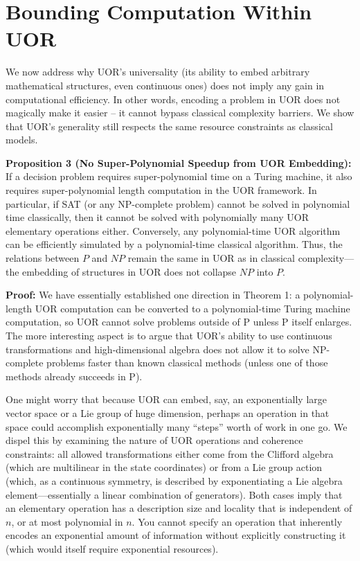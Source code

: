 \documentclass{article}
\begin{document}
\section{Bounding Computation Within UOR}

We now address why UOR’s universality (its ability to embed arbitrary mathematical structures, even continuous ones) does not imply any gain in computational efficiency. In other words, encoding a problem in UOR does not magically make it easier – it cannot bypass classical complexity barriers. We show that UOR’s generality still respects the same resource constraints as classical models.

\medskip
\textbf{Proposition 3 (No Super-Polynomial Speedup from UOR Embedding):} If a decision problem requires super-polynomial time on a Turing machine, it also requires super-polynomial length computation in the UOR framework. In particular, if SAT (or any NP-complete problem) cannot be solved in polynomial time classically, then it cannot be solved with polynomially many UOR elementary operations either. Conversely, any polynomial-time UOR algorithm can be efficiently simulated by a polynomial-time classical algorithm. Thus, the relations between $P$ and $NP$ remain the same in UOR as in classical complexity—the embedding of structures in UOR does not collapse $NP$ into $P$.

\medskip
\textbf{Proof:} We have essentially established one direction in Theorem 1: a polynomial-length UOR computation can be converted to a polynomial-time Turing machine computation, so UOR cannot solve problems outside of P unless P itself enlarges. The more interesting aspect is to argue that UOR’s ability to use continuous transformations and high-dimensional algebra does not allow it to solve NP-complete problems faster than known classical methods (unless one of those methods already succeeds in P).

One might worry that because UOR can embed, say, an exponentially large vector space or a Lie group of huge dimension, perhaps an operation in that space could accomplish exponentially many “steps” worth of work in one go. We dispel this by examining the nature of UOR operations and coherence constraints: all allowed transformations either come from the Clifford algebra (which are multilinear in the state coordinates) or from a Lie group action (which, as a continuous symmetry, is described by exponentiating a Lie algebra element—essentially a linear combination of generators). Both cases imply that an elementary operation has a description size and locality that is independent of $n$, or at most polynomial in $n$. You cannot specify an operation that inherently encodes an exponential amount of information without explicitly constructing it (which would itself require exponential resources).
\end{document}
